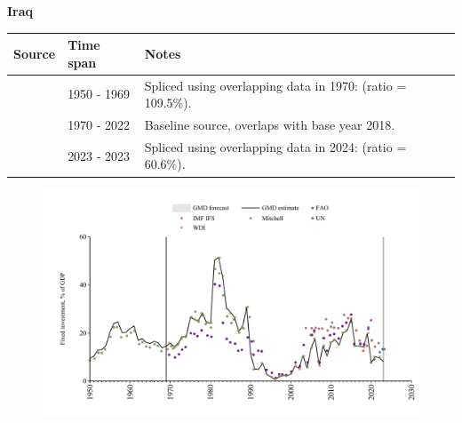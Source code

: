 \documentclass[12pt,a4paper,landscape]{article}
\begin{document}
\begin{adjustbox}{max totalsize={\paperwidth}{\paperheight},center}
\begin{minipage}[t][\textheight][t]{\textwidth}
\vspace*{0.5cm}
{}
\begin{center}
{\Large\bfseries Iraq}
\end{center}
\vspace{0.5cm}
\begin{table}[H]
\centering
\small
\begin{tabular}{|l|l|l|}
\hline
\textbf{Source} & \textbf{Time span} & \textbf{Notes} \\
\hline
\rowcolor{white}\cite{Mitchell}& 1950 - 1969 &Spliced using overlapping data in 1970: (ratio = 109.5\%).\\
\rowcolor{lightgray}\cite{WDI}& 1970 - 2022 &Baseline source, overlaps with base year 2018.\\
\rowcolor{white}\cite{IMF_IFS}& 2023 - 2023 &Spliced using overlapping data in 2024: (ratio = 60.6\%).\\
\hline
\end{tabular}
\end{table}
\begin{figure}[H]
\centering
\includegraphics[width=\textwidth,height=0.6\textheight,keepaspectratio]{graphs/IRQ_finv_GDP.pdf}
\end{figure}
\end{minipage}
\end{adjustbox}
\end{document}
